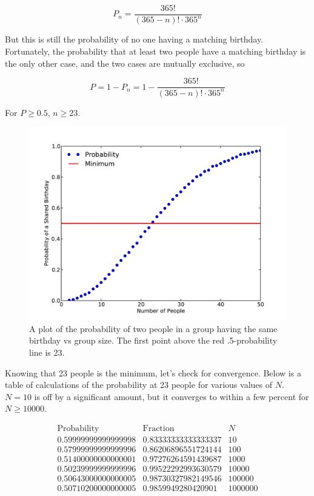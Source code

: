 \documentclass[11pt,letterpaper]{article}
\begin{document}
$$ P_n = \frac{365!}{(365-n)! \cdot 365^n} $$

But this is still the probability of no one having a matching birthday. Fortunately, the probability that at least two people have a matching birthday is the only other case, and the two cases are mutually exclusive, so 

$$ P = 1 - P_n = 1 - \frac{365!}{(365-n)! \cdot 365^n} $$

For $P \ge 0.5$, $n \ge 23$.

\begin{figure}[!htb]\centering
  \includegraphics[width=1\textwidth]{Birthday}
  \caption{A plot of the probability of two people in a group having the same birthday vs group size. The first point above the red .5-probability line is 23.}
  \end{figure}

Knowing that 23 people is the minimum, let's check for convergence. Below is a table of calculations of the probability at 23 people for various values of $N$. $N=10$ is off by a significant amount, but it converges to within a few percent for $N \ge 10000$.

\[
\begin{array}{ccc}
\text{Probability} & \text{Fraction} & N \\
0.59999999999999998 & 0.83333333333333337 & 10 \\
0.57999999999999996 & 0.86206896551724144 & 100 \\
0.51400000000000001 & 0.97276264591439687 & 1000 \\
0.50239999999999996 & 0.99522292993630579 & 10000 \\
0.50643000000000005 & 0.98730327982149546 & 100000 \\
0.50710200000000005 & 0.9859949280420901 & 1000000
\end{array}
\]
\end{document}
